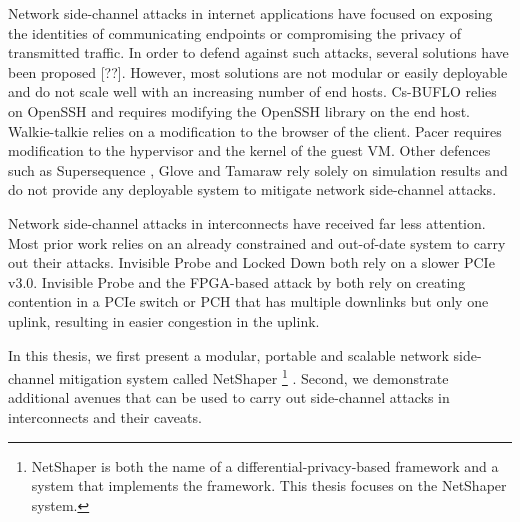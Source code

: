 Network side-channel attacks in internet applications have focused on exposing the identities of communicating endpoints or compromising the privacy of transmitted traffic.
In order to defend against such attacks, several solutions have been proposed [??]. 
However, most solutions are not modular or easily deployable and do not scale well with an increasing number of end hosts.
Cs-BUFLO \cite{cai2014csbuflo} relies on OpenSSH and requires modifying the OpenSSH library on the end host. 
Walkie-talkie \cite{wang2017walkie} relies on a modification to the browser of the client.
Pacer \cite{mehta2022pacer} requires modification to the hypervisor and the kernel of the guest VM.
Other defences such as Supersequence \cite{wang2014supersequence}, Glove \cite{nithyanand2014glove} and Tamaraw \cite{cai2014tamaraw} rely solely on simulation results and do not provide any deployable system to mitigate network side-channel attacks.

Network side-channel attacks in interconnects have received far less attention.
Most prior work relies on an already constrained and out-of-date system to carry out their attacks.
Invisible Probe \cite{tan2021invisible} and Locked Down \cite{side2022lockeddown} both rely on a slower PCIe v3.0.
Invisible Probe \cite{tan2021invisible} and the FPGA-based attack by \citet{giechaskiel2022cross} both rely on creating contention in a PCIe switch or PCH that has multiple downlinks but only one uplink, resulting in easier congestion in the uplink.

In this thesis, we first present a modular, portable and scalable network side-channel mitigation system called NetShaper 
\footnote{NetShaper is both the name of a differential-privacy-based framework and a system that implements the framework. This thesis focuses on the NetShaper system.} \cite{sabzi2024netshaper}.
Second, we demonstrate additional avenues that can be used to carry out side-channel attacks in interconnects and their caveats.

% 



\endinput

- The security and privacy of data in transit, whether it be on the internet or within a server (on the interconnect), is important. 
- While encryption has become the norm to ensure the security and privacy of data in transit, side-channel attacks can undermine this by using metadata like the shape of the traffic.
- Side-channel attacks can affect both data being sent over the internet and over interconnects
- While there is significant prior work in defending against side channels in internet networks, the solutions are not easily deployable and are not modular.
- In addition, prior work has provided limited focus on how side-channels can be carried out on interconnects.

